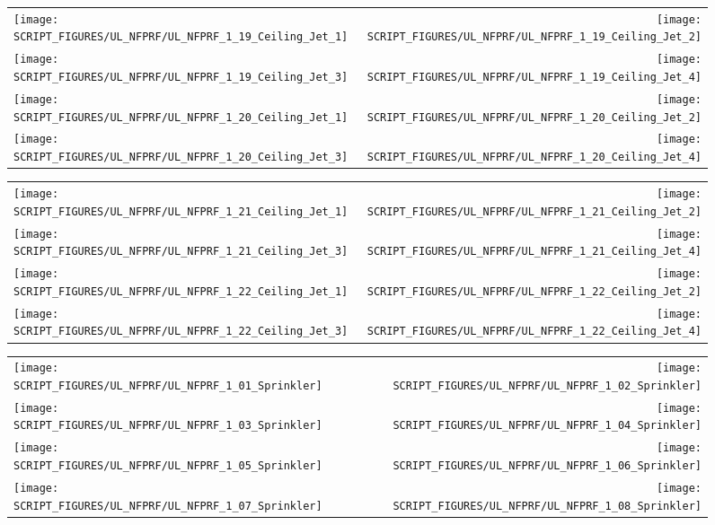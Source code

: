 \begin{figure}[!ht]
\begin{tabular*}{\textwidth}{l@{\extracolsep{\fill}}r}
\texttt{[image: SCRIPT\_FIGURES/UL\_NFPRF/UL\_NFPRF\_1\_19\_Ceiling\_Jet\_1]} &
\texttt{[image: SCRIPT\_FIGURES/UL\_NFPRF/UL\_NFPRF\_1\_19\_Ceiling\_Jet\_2]} \\
\texttt{[image: SCRIPT\_FIGURES/UL\_NFPRF/UL\_NFPRF\_1\_19\_Ceiling\_Jet\_3]} &
\texttt{[image: SCRIPT\_FIGURES/UL\_NFPRF/UL\_NFPRF\_1\_19\_Ceiling\_Jet\_4]} \\
\texttt{[image: SCRIPT\_FIGURES/UL\_NFPRF/UL\_NFPRF\_1\_20\_Ceiling\_Jet\_1]} &
\texttt{[image: SCRIPT\_FIGURES/UL\_NFPRF/UL\_NFPRF\_1\_20\_Ceiling\_Jet\_2]} \\
\texttt{[image: SCRIPT\_FIGURES/UL\_NFPRF/UL\_NFPRF\_1\_20\_Ceiling\_Jet\_3]} &
\texttt{[image: SCRIPT\_FIGURES/UL\_NFPRF/UL\_NFPRF\_1\_20\_Ceiling\_Jet\_4]}
\end{tabular*}
\end{figure}

\begin{figure}[!ht]
\begin{tabular*}{\textwidth}{l@{\extracolsep{\fill}}r}
\texttt{[image: SCRIPT\_FIGURES/UL\_NFPRF/UL\_NFPRF\_1\_21\_Ceiling\_Jet\_1]} &
\texttt{[image: SCRIPT\_FIGURES/UL\_NFPRF/UL\_NFPRF\_1\_21\_Ceiling\_Jet\_2]} \\
\texttt{[image: SCRIPT\_FIGURES/UL\_NFPRF/UL\_NFPRF\_1\_21\_Ceiling\_Jet\_3]} &
\texttt{[image: SCRIPT\_FIGURES/UL\_NFPRF/UL\_NFPRF\_1\_21\_Ceiling\_Jet\_4]} \\
\texttt{[image: SCRIPT\_FIGURES/UL\_NFPRF/UL\_NFPRF\_1\_22\_Ceiling\_Jet\_1]} &
\texttt{[image: SCRIPT\_FIGURES/UL\_NFPRF/UL\_NFPRF\_1\_22\_Ceiling\_Jet\_2]} \\
\texttt{[image: SCRIPT\_FIGURES/UL\_NFPRF/UL\_NFPRF\_1\_22\_Ceiling\_Jet\_3]} &
\texttt{[image: SCRIPT\_FIGURES/UL\_NFPRF/UL\_NFPRF\_1\_22\_Ceiling\_Jet\_4]}
\end{tabular*}
\end{figure}

\begin{figure}[!ht]
\begin{tabular*}{\textwidth}{l@{\extracolsep{\fill}}r}
\texttt{[image: SCRIPT\_FIGURES/UL\_NFPRF/UL\_NFPRF\_1\_01\_Sprinkler]} &
\texttt{[image: SCRIPT\_FIGURES/UL\_NFPRF/UL\_NFPRF\_1\_02\_Sprinkler]} \\
\texttt{[image: SCRIPT\_FIGURES/UL\_NFPRF/UL\_NFPRF\_1\_03\_Sprinkler]} &
\texttt{[image: SCRIPT\_FIGURES/UL\_NFPRF/UL\_NFPRF\_1\_04\_Sprinkler]} \\
\texttt{[image: SCRIPT\_FIGURES/UL\_NFPRF/UL\_NFPRF\_1\_05\_Sprinkler]} &
\texttt{[image: SCRIPT\_FIGURES/UL\_NFPRF/UL\_NFPRF\_1\_06\_Sprinkler]} \\
\texttt{[image: SCRIPT\_FIGURES/UL\_NFPRF/UL\_NFPRF\_1\_07\_Sprinkler]} &
\texttt{[image: SCRIPT\_FIGURES/UL\_NFPRF/UL\_NFPRF\_1\_08\_Sprinkler]}
\end{tabular*}
\end{figure}

